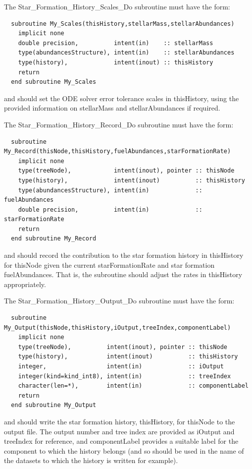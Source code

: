 The {\normalfont \ttfamily Star\_Formation\_History\_Scales\_Do} subroutine must have the form:
\begin{verbatim}
  subroutine My_Scales(thisHistory,stellarMass,stellarAbundances)
    implicit none
    double precision,          intent(in)    :: stellarMass
    type(abundancesStructure), intent(in)    :: stellarAbundances
    type(history),             intent(inout) :: thisHistory
    return
  end subroutine My_Scales
\end{verbatim}
and should set the ODE solver error tolerance scales in {\normalfont \ttfamily thisHistory}, using the provided information on {\normalfont \ttfamily stellarMass} and {\normalfont \ttfamily stellarAbundances} if required.

The {\normalfont \ttfamily Star\_Formation\_History\_Record\_Do} subroutine must have the form:
\begin{verbatim}
  subroutine My_Record(thisNode,thisHistory,fuelAbundances,starFormationRate)
    implicit none
    type(treeNode),            intent(inout), pointer :: thisNode
    type(history),             intent(inout)          :: thisHistory
    type(abundancesStructure), intent(in)             :: fuelAbundances
    double precision,          intent(in)             :: starFormationRate
    return
  end subroutine My_Record
\end{verbatim}
and should record the contribution to the star formation history in {\normalfont \ttfamily thisHistory} for {\normalfont \ttfamily thisNode} given the current {\normalfont \ttfamily starFormationRate} and star formation {\normalfont \ttfamily fuelAbundances}. That is, the subroutine should adjust the rates in {\normalfont \ttfamily thisHistory} appropriately.

The {\normalfont \ttfamily Star\_Formation\_History\_Output\_Do} subroutine must have the form:
\begin{verbatim}
  subroutine My_Output(thisNode,thisHistory,iOutput,treeIndex,componentLabel)
    implicit none
    type(treeNode),          intent(inout), pointer :: thisNode
    type(history),           intent(inout)          :: thisHistory
    integer,                 intent(in)             :: iOutput
    integer(kind=kind_int8), intent(in)             :: treeIndex
    character(len=*),        intent(in)             :: componentLabel
    return
  end subroutine My_Output
\end{verbatim}
and should write the star formation history, {\normalfont \ttfamily thisHistory}, for {\normalfont \ttfamily thisNode} to the output file. The output number and tree index are provided as {\normalfont \ttfamily iOutput} and {\normalfont \ttfamily treeIndex} for reference, and {\normalfont \ttfamily componentLabel} provides a suitable label for the component to which the history belongs (and so should be used in the name of the datasets to which the history is written for example).

